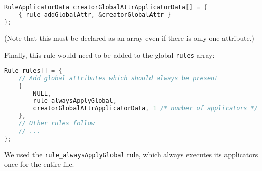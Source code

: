 \documentclass{report}
\begin{document}
\begin{lstlisting}[language=c]
RuleApplicatorData creatorGlobalAttrApplicatorData[] = {
    { rule_addGlobalAttr, &creatorGlobalAttr }
};
\end{lstlisting}

(Note that this must be declared as an array even if there is only one attribute.)

Finally, this rule would need to be added to the global \texttt{rules} array:
\begin{lstlisting}[language=c]
Rule rules[] = {
    // Add global attributes which should always be present
    {
        NULL,
        rule_alwaysApplyGlobal,
        creatorGlobalAttrApplicatorData, 1 /* number of applicators */
    },
    // Other rules follow
    // ...
};
\end{lstlisting}

We used the \texttt{rule\_alwaysApplyGlobal} rule, which always executes its applicators once for the entire file.
\end{document}
